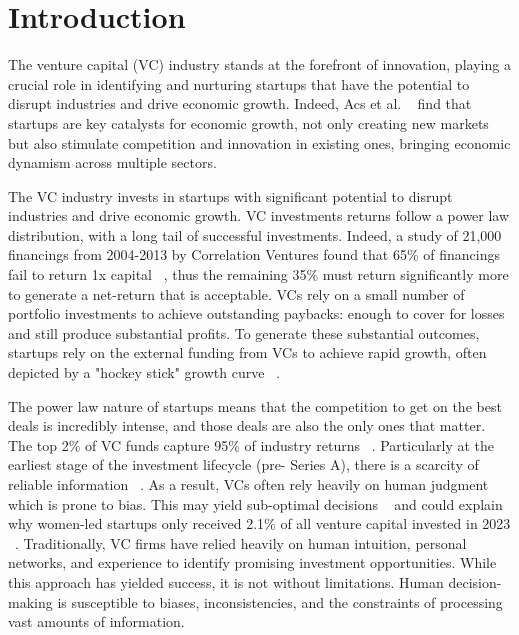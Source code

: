 \documentclass[a4paper, oneside]{discothesis}
\begin{document}
\chapter{Introduction}

The venture capital (VC) industry stands at the forefront of innovation, playing a crucial role
in identifying and nurturing startups that have the potential to disrupt industries and drive
economic growth. Indeed, Acs et al. ~\cite{acs} find that startups are key catalysts for economic growth, 
not only creating new markets but also stimulate competition and innovation in existing ones, bringing economic dynamism across multiple sectors. 

The VC industry invests in startups with significant potential to disrupt industries and drive economic growth. 
VC investments returns follow a power law distribution, with a long tail of successful investments. 
Indeed, a study of 21,000 financings from 2004-2013 by Correlation Ventures found that 65\% of financings fail to return 1x capital ~\cite{levine2014venture}, 
thus the remaining 35\% must return significantly more to generate a net-return that is acceptable. 
VCs rely on a small number of portfolio investments to achieve outstanding paybacks: enough to cover for losses and
still produce substantial profits. To generate these substantial outcomes, startups rely on the external funding from VCs
to achieve rapid growth, often depicted by a "hockey stick" growth curve ~\cite{marmer}.

The power law nature of startups means that the competition to get on the best deals is incredibly intense, and those 
deals are also the only ones that matter. The top 2\% of VC funds capture 95\% of industry
returns ~\cite{bai}. Particularly at the earliest stage of the investment lifecycle (pre- Series A), there is a scarcity of
reliable information ~\cite{dellermann}. As a result, VCs often rely heavily on human judgment which is prone to bias. 
This may yield sub-optimal decisions ~\cite{cummingdai} and could explain why women-led startups only received 2.1\% of all venture capital invested in 2023 ~\cite{pitchbook2024vc}.
Traditionally, VC firms have relied heavily on human intuition, personal networks, and experience
to identify promising investment opportunities. While this approach has yielded success, it is
not without limitations. Human decision-making is susceptible to biases, inconsistencies, and the
constraints of processing vast amounts of information.
\end{document}
